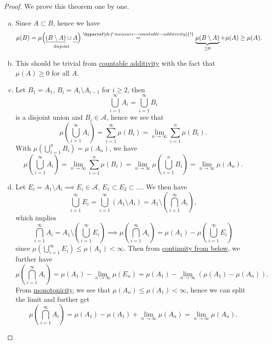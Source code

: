 \begin{proof}
	We prove this theorem one by one.
	\begin{enumerate}[(a)]
		\item Since \(A\subset B\), hence we have
		      \[
			      \mu(B) = \mu\underset{\text{disjoint} }{\left(\underline{(B\setminus A)}\cup \underline{\vphantom{(B\setminus A)}A}\right)} \overset{\hyperref[def:measure-countable-additivity]{!}}{=} \underbrace{\mu(B\setminus A)}_{\geq 0} + \mu(A) \geq \mu(A).
		      \]
		\item This should be trivial from \hyperref[def:measure-countable-additivity]{countable additivity} with the fact that \(\mu(A)\geq 0\) for all \(A\). 
		\item Let \(B_1 = A_1\), \(B_{i} = A_{i} \setminus A_{i-1}\) for \(i\geq 2\), then
		      \[
			      \bigcup_{i=1}^{\infty} A_{i} = \bigcup_{i=1}^{\infty} B_{i}
		      \]
		      is a disjoint union and \(B_{i}\in \mathcal{A}\), hence we see that
		      \[
			      \mu\left(\bigcup_{i=1}^{\infty} A_{i}\right) = \sum_{i=1}^{\infty} \mu(B_{i}) = \lim_{n \to \infty} \sum_{i=1}^{n} \mu(B_{i}).
		      \]
		      With \(\mu\left(\bigcup_{i=1}^{n} B_{i}\right) = \mu(A_{n})\), we have
		      \[
			      \mu\left(\bigcup_{i=1}^{\infty} A_{i}\right) = \lim_{n \to \infty} \sum_{i=1}^{n} \mu(B_{i}) = \lim_{n \to \infty} \mu\left(\bigcup_{i=1}^{n} B_{i}\right) = \lim_{n \to \infty} \mu(A_{n}).
		      \]
		\item Let \(E_{i} = A_{1} \setminus A_{i} \implies E_{i}\in \mathcal{A}\), \(E_1\subset E_2\subset \dots\). We then have
		      \[
			      \bigcup_{i=1}^{\infty} E_{i} = \bigcup_{i=1}^{\infty} \left(A_1 \setminus A_{i}\right) = A_1 \setminus \left(\bigcap_{i=1}^{\infty} A_{i}\right),
		      \]
		      which implies
		      \[
			      \bigcap_{i=1}^{\infty} A_{i} = A_1 \setminus \left(\bigcup_{i=1}^{\infty} E_{i}\right) \implies \mu\left(\bigcap_{i=1}^{\infty} A_{i}\right) = \mu(A_1) - \mu\left(\bigcup_{i=1}^{\infty} E_{i}\right)
		      \]
		      since \(\mu\left(\bigcup_{i=1}^{\infty} E_{i}\right) \leq \mu(A_1) < \infty \). Then from \hyperref[thm:measure-space-continuity-from-below]{continuity from below}, we further have
		      \[
			      \mu\left(\bigcap_{i=1}^{\infty} A_{i}\right) = \mu(A_1) - \lim_{n \to \infty} \mu(E_{n}) = \mu(A_1) - \lim_{n \to \infty} \left(\mu(A_1) - \mu(A_{n})\right).
		      \]
		      From \hyperref[thm:measure-space-monotonicity]{monotonicity}, we see that \(\mu(A_{n})\leq \mu(A_1) < \infty\), hence we can split the limit and further get
		      \[
			      \mu\left(\bigcap_{i=1}^{\infty} A_{i}\right) = \mu(A_1) - \mu(A_1) + \lim_{n \to \infty} \mu(A_{n}) = \lim_{n \to \infty} \mu(A_{n}).
		      \]
	\end{enumerate}
\end{proof}
